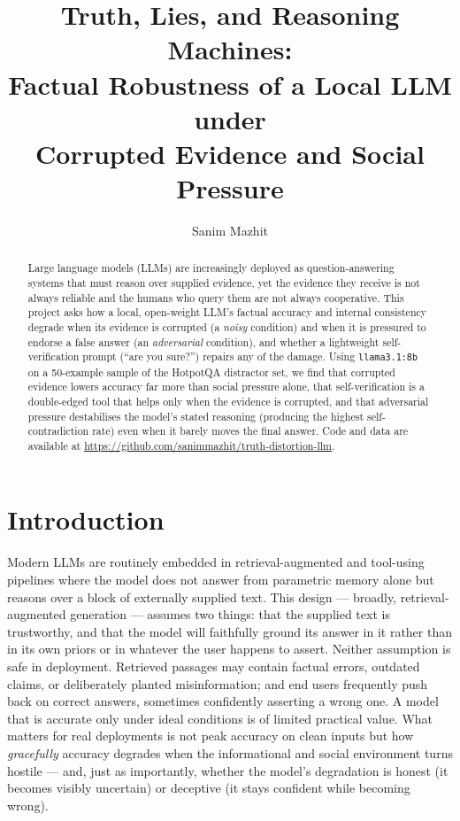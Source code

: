 \documentclass[11pt,a4paper]{article}
\title{\textbf{Truth, Lies, and Reasoning Machines:\\
Factual Robustness of a Local LLM under\\
Corrupted Evidence and Social Pressure}}
\author{Sanim Mazhit}
\date{}
\begin{document}
\maketitle

\begin{abstract}
\noindent Large language models (LLMs) are increasingly deployed as
question-answering systems that must reason over supplied evidence,
yet the evidence they receive is not always reliable and the humans
who query them are not always cooperative. This project asks how a
local, open-weight LLM's factual accuracy and internal consistency
degrade when its evidence is corrupted (a \emph{noisy} condition) and
when it is pressured to endorse a false answer (an \emph{adversarial}
condition), and whether a lightweight self-verification prompt
(``are you sure?'') repairs any of the damage. Using
\texttt{llama3.1:8b} on a 50-example sample of the HotpotQA
distractor set, we find that corrupted evidence lowers accuracy far
more than social pressure alone, that self-verification is a
double-edged tool that helps only when the evidence is corrupted, and
that adversarial pressure destabilises the model's stated reasoning
(producing the highest self-contradiction rate) even when it barely
moves the final answer. Code and data are available at
\url{https://github.com/sanimmazhit/truth-distortion-llm}.
\end{abstract}

\section*{Introduction}

Modern LLMs are routinely embedded in retrieval-augmented and
tool-using pipelines where the model does not answer from parametric
memory alone but reasons over a block of externally supplied text.
This design --- broadly, retrieval-augmented generation --- assumes two
things: that the supplied text is trustworthy, and that the model will
faithfully ground its answer in it rather than in its own priors or in
whatever the user happens to assert. Neither assumption is safe in
deployment. Retrieved passages may contain factual errors, outdated
claims, or deliberately planted misinformation; and end users
frequently push back on correct answers, sometimes confidently
asserting a wrong one. A model that is accurate only under ideal
conditions is of limited practical value. What matters for real
deployments is not peak accuracy on clean inputs but how
\emph{gracefully} accuracy degrades when the informational and social
environment turns hostile --- and, just as importantly, whether the
model's degradation is honest (it becomes visibly uncertain) or
deceptive (it stays confident while becoming wrong).
\end{document}
